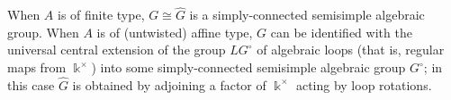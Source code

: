 \documentclass[12pt]{amsart}
\newcommand{\kk}{\Bbbk}%
\newcommand\onto{\twoheadrightarrow}
\newcommand\into{\hookrightarrow}
\DeclareMathOperator{\Hom}{Hom}
\theoremstyle{remark}
\numberwithin{equation}{section}
\begin{document}
When $A$ is of finite type, $G \cong \widehat{G}$ is a simply-connected semisimple algebraic group. When $A$ is of (untwisted) affine type, $G$ can be identified with the universal central extension of the group $LG^\circ$ of algebraic loops (that is, regular maps from $\kk^\times$) into some simply-connected semisimple algebraic group $G^\circ$; in this case $\widehat{G}$ is obtained by adjoining a factor of $\kk^\times$ acting by loop rotations.




\end{document}
